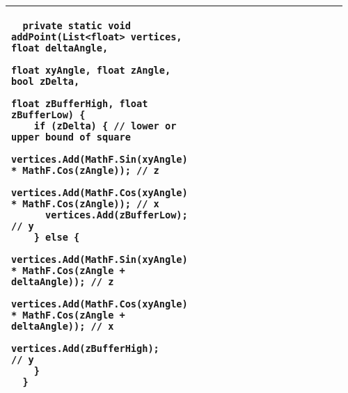 \documentclass[main.tex,fontsize=8pt,paper=a4,paper=portrait,DIV=calc,]{scrartcl}
\begin{document}
\begin{table}[ht!]
\begin{tabular}{|m{0.2\linewidth}|m{0.755\linewidth}|}
\begin{lstlisting}
  private static void addPoint(List<float> vertices, float deltaAngle,
                               float xyAngle, float zAngle, bool zDelta,
                               float zBufferHigh, float zBufferLow) {
    if (zDelta) { // lower or upper bound of square
      vertices.Add(MathF.Sin(xyAngle) * MathF.Cos(zAngle)); // z
      vertices.Add(MathF.Cos(xyAngle) * MathF.Cos(zAngle)); // x
      vertices.Add(zBufferLow);                             // y
    } else {
      vertices.Add(MathF.Sin(xyAngle) * MathF.Cos(zAngle + deltaAngle)); // z
      vertices.Add(MathF.Cos(xyAngle) * MathF.Cos(zAngle + deltaAngle)); // x
      vertices.Add(zBufferHigh);                                         // y
    }
  }
\end{lstlisting}\\
\hline
\end{tabular}
\end{table}
\pagebreak
\end{document}
